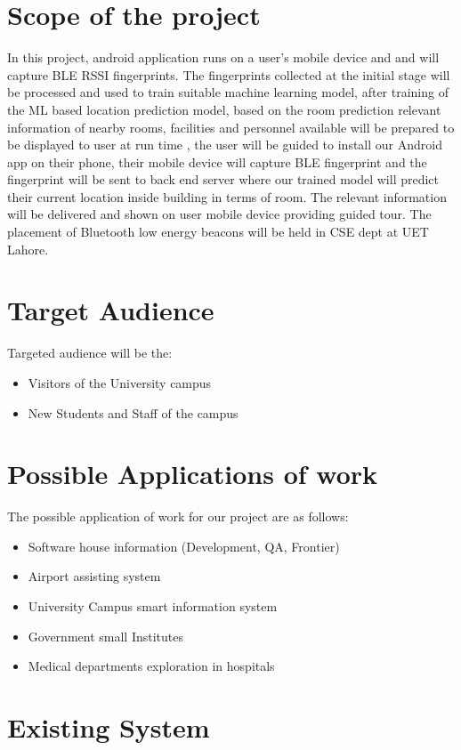 \documentclass{article}
\begin{document}
\section{Scope of the project}
In this project, android application runs on a user’s mobile device and and will capture BLE RSSI fingerprints. The fingerprints collected at the initial stage will be processed and used to train suitable machine learning model, after training of the ML based location prediction model, based on the room prediction relevant information of nearby rooms, facilities and personnel available will be prepared to be displayed to user at run time , the user will be guided to install our Android app on their phone, their mobile device will capture BLE fingerprint and the fingerprint will be sent to back end server where our trained model will predict their current location inside building in terms of room\cite{Loco}. The relevant information will be delivered and shown on user mobile device providing guided tour. 
The placement of Bluetooth low energy beacons will be held in CSE dept at UET Lahore. 


\section{Target Audience}
Targeted audience will be the:
\begin{itemize}
\item Visitors of the University campus 
\item New Students and Staff of the campus
\end{itemize}



\section{Possible Applications of work}
The possible application of work for our project are as follows:


\begin{itemize}
\item Software house information (Development, QA, Frontier)
\item Airport assisting system
\item University Campus smart information system
\item Government small Institutes
\item Medical departments exploration in hospitals
\end{itemize}

\section{Existing System}
\end{document}
